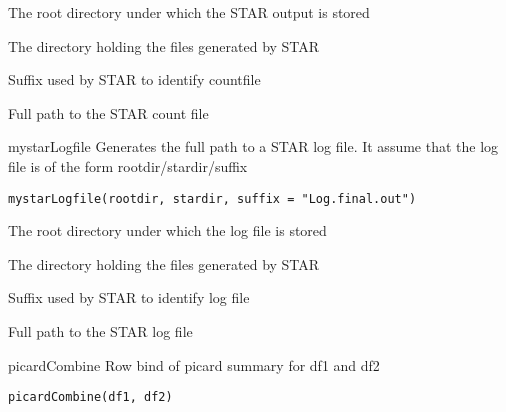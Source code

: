 \documentclass[letterpaper]{book}
\begin{document}
%
\begin{Arguments}
\begin{ldescription}
\item[\code{rootdir}] The root directory under which the STAR output is stored

\item[\code{stardir}] The directory holding the files generated by STAR

\item[\code{suffix}] Suffix used by STAR to identify countfile
\end{ldescription}
\end{Arguments}
%
\begin{Value}
Full path to the STAR count file
\end{Value}
%
\begin{Description}\relax
mystarLogfile
Generates the full path to a STAR log file.
It assume that the log file is of the form
rootdir/stardir/suffix
\end{Description}
%
\begin{Usage}
\begin{verbatim}
mystarLogfile(rootdir, stardir, suffix = "Log.final.out")
\end{verbatim}
\end{Usage}
%
\begin{Arguments}
\begin{ldescription}
\item[\code{rootdir}] The root directory under which the log file is stored

\item[\code{stardir}] The directory holding the files generated by STAR

\item[\code{suffix}] Suffix used by STAR to identify log file
\end{ldescription}
\end{Arguments}
%
\begin{Value}
Full path to the STAR log file
\end{Value}
%
\begin{Description}\relax
picardCombine
Row bind of picard summary for df1 and df2
\end{Description}
%
\begin{Usage}
\begin{verbatim}
picardCombine(df1, df2)
\end{verbatim}
\end{Usage}
\end{document}
